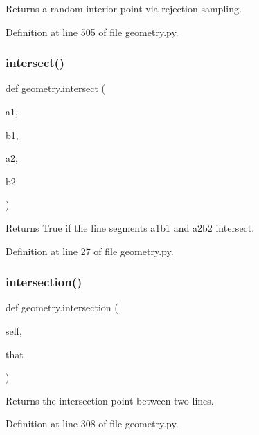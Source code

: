 \begin{DoxyVerb}Returns a random interior point via rejection sampling.\end{DoxyVerb}
 

Definition at line 505 of file geometry.\+py.

\mbox{\label{namespacegeometry_a3df8ee137b8d01576f14084dee3a6a91}} 
\subsubsection{\texorpdfstring{intersect()}{intersect()}}
{\footnotesize\ttfamily def geometry.\+intersect (\begin{DoxyParamCaption}\item[{}]{a1,  }\item[{}]{b1,  }\item[{}]{a2,  }\item[{}]{b2 }\end{DoxyParamCaption})}

\begin{DoxyVerb}Returns True if the line segments a1b1 and a2b2 intersect.\end{DoxyVerb}
 

Definition at line 27 of file geometry.\+py.

\mbox{\label{namespacegeometry_afe255f1239fc866c1c2c04b30c37b696}} 
\subsubsection{\texorpdfstring{intersection()}{intersection()}}
{\footnotesize\ttfamily def geometry.\+intersection (\begin{DoxyParamCaption}\item[{}]{self,  }\item[{}]{that }\end{DoxyParamCaption})}

\begin{DoxyVerb}Returns the intersection point between two lines.\end{DoxyVerb}
 

Definition at line 308 of file geometry.\+py.

\mbox{\label{namespacegeometry_a08506b08fe50ecd6e3c7098f63178881}} 
